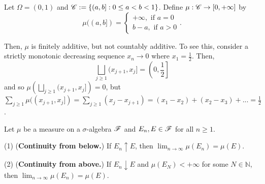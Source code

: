 \begin{example}
  Let $\Omega = (0, 1)$ and $\mathscr{C} := \{ (a, b] : 0 \leq a < b < 1 \}$. Define $\mu: \mathscr{C} \to [0, +\infty]$ by
  \[ 
  \mu((a, b]) = 
  \begin{cases}
  + \infty, \text{ if } a = 0 \\
  b - a, \text{ if } a > 0
  \end{cases}.
  \]

  Then, $\mu$ is finitely additive, but not countably additive. To see this, consider a strictly monotonic decreasing sequence $x_n \to 0$ where $x_1 = \frac{1}{2}$. Then, 
  \[
  \bigsqcup_{j \geq 1} (x_{j + 1}, x_j] = \left(0, \frac{1}{2}\right]
  \]
  and so $\mu\left(\bigsqcup_{j \geq 1} (x_{j + 1}, x_j]\right) = 0$, but $\sum_{j \geq 1} \mu((x_{j + 1}, x_j]) = \sum_{j \geq 1} (x_j - x_{j + 1}) = (x_1 - x_2) + (x_2 - x_3) + ... = \frac{1}{2}$.
\end{example}

\begin{lemma}
  Let $\mu$ be a measure on a $\sigma$-algebra $\mathscr{F}$ and $E_n, E \in \mathscr{F}$ for all $n \geq 1$.

  (1) (\textbf{Continuity from below.}) If $E_n \uparrow E$, then $\lim_{n \to \infty} \mu(E_n) = \mu(E)$.
  
  (2) (\textbf{Continuity from above.}) If $E_n \downarrow E$ and $\mu(E_{N}) < + \infty$ for some $N \in \mathbb{N}$, then $\lim_{n \to \infty} \mu(E_n) = \mu(E)$.
\end{lemma}

